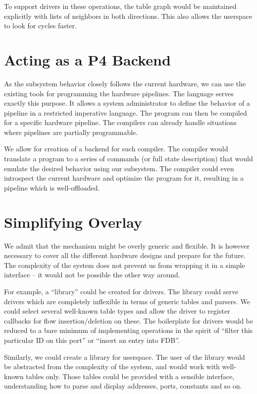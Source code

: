 To support drivers in these operations, the table graph would be maintained
explicitly with lists of neighbors in both directions. This also allows the
userspace to look for cycles faster.

\section{Acting as a P4 Backend}

As the subsystem behavior closely follows the current hardware, we can use the existing
tools for programming the hardware pipelines. The  language serves exactly
this purpose. It allows a system administrator to define the behavior of
a pipeline in a restricted imperative language. The program can then be compiled
for a specific hardware pipeline. The compilers can already handle situations
where pipelines are partially programmable.

We allow for creation of a backend for such compiler. The compiler would
translate a  program to a series of commands (or full state description) that
would emulate the desired behavior using our subsystem. The compiler could even
introspect the current hardware and optimize the program for it, resulting in
a pipeline which is well-offloaded.

\section{Simplifying Overlay}

We admit that the mechanism might be overly generic and flexible. It is however
necessary to cover all the different hardware designs and prepare for the
future. The complexity of the system does not prevent us from wrapping it in
a simple interface -- it would not be possible the other way around.

For example, a ``library'' could be created for drivers. The library could
serve drivers which are completely inflexible in terms of generic tables and
parsers. We could select several well-known table types and allow the driver to
register callbacks for flow insertion/deletion on these. The boilerplate for
drivers would be reduced to a bare minimum of implementing operations in the spirit
of ``filter this particular  ID on this port'' or ``insert an entry
into FDB''.

Similarly, we could create a library for userspace. The user of the library
would be abstracted from the complexity of the system, and would work with
well-known tables only. Those tables could be provided with a sensible
interface, understanding how to parse and display addresses, ports, constants
and so on.

